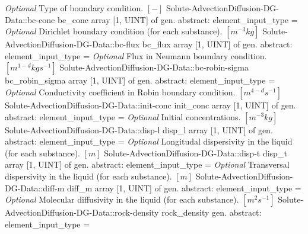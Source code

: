 \begin{RecordType}
			{ \it{Optional}}
			{{{Type of boundary condition. }{$[-]$}%
}}
		\RecKey
			{Solute-AdvectionDiffusion-DG-Data::bc-conc}
			{bc{\_}conc}
			{{array [1, UINT] of }{gen. abstract: }}{{element{\_}input{\_}type}{ = }}
			{ \it{Optional}}
			{{{Dirichlet boundary condition (for each substance). }{$[m^{-3}kg]$}%
}}
		\RecKey
			{Solute-AdvectionDiffusion-DG-Data::bc-flux}
			{bc{\_}flux}
			{{array [1, UINT] of }{gen. abstract: }}{{element{\_}input{\_}type}{ = }}
			{ \it{Optional}}
			{{{Flux in Neumann boundary condition. }{$[m^{1-d}kgs^{-1}]$}%
}}
		\RecKey
			{Solute-AdvectionDiffusion-DG-Data::bc-robin-sigma}
			{bc{\_}robin{\_}sigma}
			{{array [1, UINT] of }{gen. abstract: }}{{element{\_}input{\_}type}{ = }}
			{ \it{Optional}}
			{{{Conductivity coefficient in Robin boundary condition. }{$[m^{4-d}s^{-1}]$}%
}}
		\RecKey
			{Solute-AdvectionDiffusion-DG-Data::init-conc}
			{init{\_}conc}
			{{array [1, UINT] of }{gen. abstract: }}{{element{\_}input{\_}type}{ = }}
			{ \it{Optional}}
			{{{Initial concentrations. }{$[m^{-3}kg]$}%
}}
		\RecKey
			{Solute-AdvectionDiffusion-DG-Data::disp-l}
			{disp{\_}l}
			{{array [1, UINT] of }{gen. abstract: }}{{element{\_}input{\_}type}{ = }}
			{ \it{Optional}}
			{{{Longitudal dispersivity in the liquid (for each substance). }{$[m]$}%
}}
		\RecKey
			{Solute-AdvectionDiffusion-DG-Data::disp-t}
			{disp{\_}t}
			{{array [1, UINT] of }{gen. abstract: }}{{element{\_}input{\_}type}{ = }}
			{ \it{Optional}}
			{{{Transversal dispersivity in the liquid (for each substance). }{$[m]$}%
}}
		\RecKey
			{Solute-AdvectionDiffusion-DG-Data::diff-m}
			{diff{\_}m}
			{{array [1, UINT] of }{gen. abstract: }}{{element{\_}input{\_}type}{ = }}
			{ \it{Optional}}
			{{{Molecular diffusivity in the liquid (for each substance). }{$[m^{2}s^{-1}]$}%
}}
		\RecKey
			{Solute-AdvectionDiffusion-DG-Data::rock-density}
			{rock{\_}density}
			{{gen. abstract: }}{{element{\_}input{\_}type}{ = }}

\end{RecordType}
